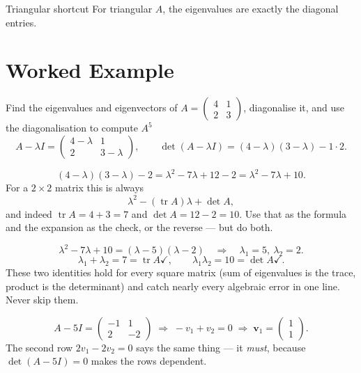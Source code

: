 \begin{rulebox}{Triangular shortcut}
For triangular $A$, the eigenvalues are exactly the diagonal entries.
\end{rulebox}

\section{Worked Example}

\begin{worked}{Find the eigenvalues and eigenvectors of $A=\begin{pmatrix}4&1\\2&3\end{pmatrix}$, diagonalise it, and use the diagonalisation to compute $A^{5}$}
\[
  A-\lambda I=\begin{pmatrix}4-\lambda&1\\2&3-\lambda\end{pmatrix},
  \qquad
  \det(A-\lambda I)=(4-\lambda)(3-\lambda)-1\cdot2 .
\]

\[
  (4-\lambda)(3-\lambda)-2=\lambda^{2}-7\lambda+12-2=\lambda^{2}-7\lambda+10 .
\]
For a $2\times2$ matrix this is always
\[
  \lambda^{2}-(\operatorname{tr}A)\lambda+\det A ,
\]
and indeed $\operatorname{tr}A=4+3=7$ and $\det A=12-2=10$. Use that as the
formula and the expansion as the check, or the reverse --- but do both.

\[
  \lambda^{2}-7\lambda+10=(\lambda-5)(\lambda-2)
  \quad\Longrightarrow\quad
  \lambda_{1}=5,\ \lambda_{2}=2 .
\]
\[
  \lambda_{1}+\lambda_{2}=7=\operatorname{tr}A \checkmark,
  \qquad
  \lambda_{1}\lambda_{2}=10=\det A \checkmark .
\]
These two identities hold for every square matrix (sum of eigenvalues is the
trace, product is the determinant) and catch nearly every algebraic error in
one line. Never skip them.

\[
  A-5I=\begin{pmatrix}-1&1\\2&-2\end{pmatrix}
  \;\Longrightarrow\;
  -v_{1}+v_{2}=0
  \;\Longrightarrow\;
  \mathbf v_{1}=\begin{pmatrix}1\\1\end{pmatrix}.
\]
The second row $2v_{1}-2v_{2}=0$ says the same thing --- it \emph{must},
because $\det(A-5I)=0$ makes the rows dependent.


\end{worked}
